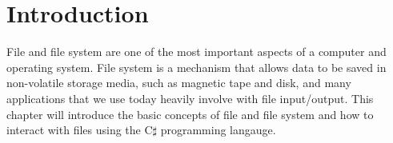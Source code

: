 \documentclass[../main.tex]{subfiles}
\begin{document}
    \section {Introduction}
    File and file system are one of the most important aspects of a computer and
    operating system. File system is a mechanism that allows data to be saved
    in non-volatile storage media, such as magnetic tape and disk, and many
    applications that we use today heavily involve with file input/output. This
    chapter will introduce the basic concepts of file and file system and how
    to interact with files using the C$\sharp$ programming langauge.
\end{document}
